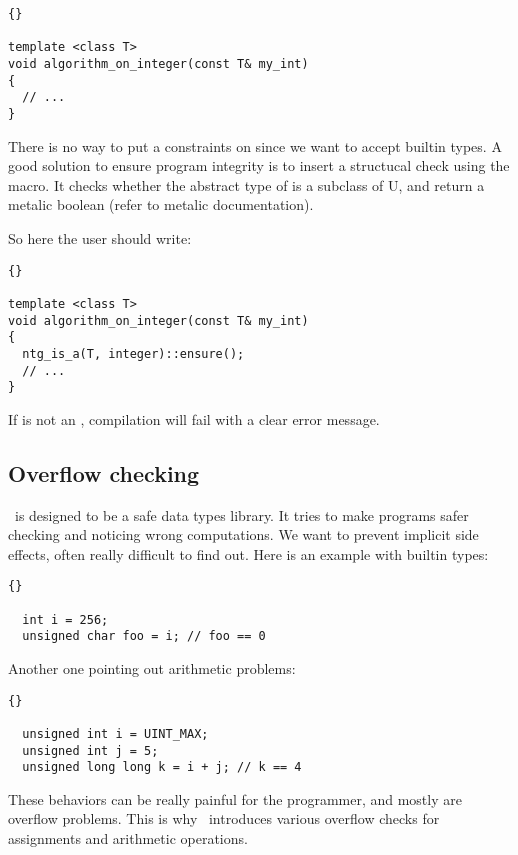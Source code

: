 \begin{lstlisting}{}

template <class T>
void algorithm_on_integer(const T& my_int)
{
  // ...
}

\end{lstlisting}

There is no way to put a constraints on  since we want to
accept builtin types. A good solution to ensure program integrity is
to insert a structucal check using the  macro. It
checks whether the abstract type of  is a subclass of U, and
return a metalic boolean (refer to metalic documentation).

So here the user should write:

\begin{lstlisting}{}

template <class T>
void algorithm_on_integer(const T& my_int)
{
  ntg_is_a(T, integer)::ensure();
  // ...
}

\end{lstlisting}

If  is not an , compilation
will fail with a clear error message.

\subsection{Overflow checking}

\integre\ is designed to be a safe data types library. It tries to
make programs safer checking and noticing wrong computations. We want
to prevent implicit side effects, often really difficult to find
out. Here is an example with builtin types:

\begin{lstlisting}{}

  int i = 256;
  unsigned char foo = i; // foo == 0

\end{lstlisting}

Another one pointing out arithmetic problems:

\begin{lstlisting}{}

  unsigned int i = UINT_MAX;
  unsigned int j = 5;
  unsigned long long k = i + j; // k == 4

\end{lstlisting}

These behaviors can be really painful for the programmer, and mostly
are overflow problems. This is why \integre\ introduces various
overflow checks for assignments and arithmetic operations.

